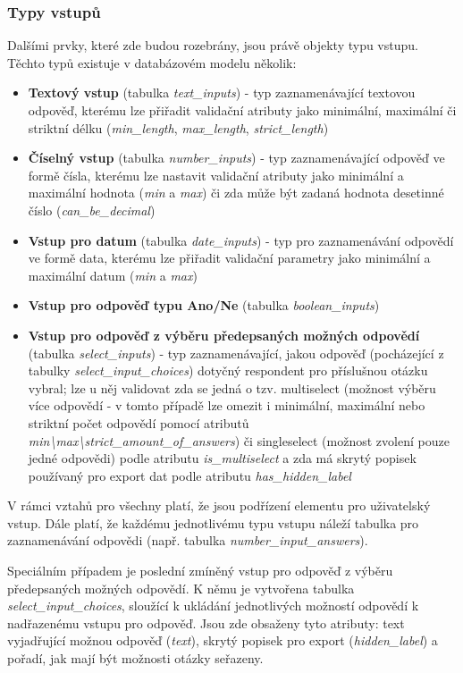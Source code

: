 	\subsubsection{Typy vstupů}
	\label{sec:form_inputs_types}
	Dalšími prvky, které zde budou rozebrány, jsou právě objekty typu vstupu. Těchto typů existuje v databázovém modelu několik:
	
	\begin{itemize}
		\item \textbf{Textový vstup} (tabulka \textit{text\_inputs}) - typ zaznamenávající textovou odpověď, kterému lze přiřadit validační atributy jako minimální, maximální či striktní délku (\textit{min\_length}, \textit{max\_length}, \textit{strict\_length})
		\item \textbf{Číselný vstup} (tabulka \textit{number\_inputs}) - typ zaznamenávající odpověď ve formě čísla, kterému lze nastavit validační atributy jako minimální a maximální hodnota (\textit{min} a \textit{max}) či zda může být zadaná hodnota desetinné číslo (\textit{can\_be\_decimal})
		\item \textbf{Vstup pro datum} (tabulka \textit{date\_inputs}) - typ pro zaznamenávání odpovědí ve formě data, kterému lze přiřadit validační parametry jako minimální a maximální datum (\textit{min} a \textit{max})
		\item \textbf{Vstup pro odpověď typu Ano/Ne} (tabulka \textit{boolean\_inputs})
		\item \textbf{Vstup pro odpověď z výběru předepsaných možných odpovědí} (tabulka \textit{select\_inputs}) - typ zaznamenávající, jakou odpověď (pocházející z tabulky \textit{select\_input\_choices}) dotyčný respondent pro příslušnou otázku vybral; lze u něj validovat zda se jedná o tzv. multiselect (možnost výběru více odpovědí - v tomto případě lze omezit i minimální, maximální nebo striktní počet odpovědí pomocí atributů \textit{min\textbackslash max\textbackslash strict\_amount\_of\_answers}) či singleselect (možnost zvolení pouze jedné odpovědi) podle atributu \textit{is\_multiselect} a zda má skrytý popisek používaný pro export dat podle atributu \textit{has\_hidden\_label}
	\end{itemize}
	
	V rámci vztahů pro všechny platí, že jsou podřízení elementu pro uživatelský vstup. Dále platí, že každému jednotlivému typu vstupu náleží tabulka pro zaznamenávání odpovědi (např. tabulka \textit{number\_input\_answers}).
	
	Speciálním případem je poslední zmíněný vstup pro odpověď z výběru předepsaných možných odpovědí. K němu je vytvořena tabulka \textit{select\_input\_choices}, sloužící k ukládání jednotlivých možností odpovědí k nadřazenému vstupu pro odpověď. Jsou zde obsaženy tyto atributy: text vyjadřující možnou odpověď (\textit{text}), skrytý popisek pro export (\textit{hidden\_label}) a pořadí, jak mají být možnosti otázky seřazeny.
	
